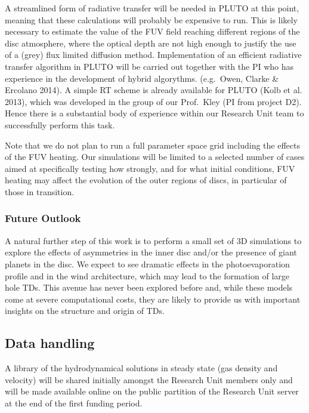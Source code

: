 \documentclass[10pt,fleqn,twoside]{article}
\begin{document}
A streamlined form of radiative transfer
will be needed in PLUTO at this point, meaning that these calculations will
probably be expensive to run.  This is likely necessary to estimate the value of the  FUV field
reaching different regions of the disc atmosphere, where the optical
depth are not high enough to justify the use of a  (grey) flux
limited diffusion method.  Implementation of an efficient
radiative transfer algorithm in PLUTO will be carried out together
with the PI who has experience in the development of hybrid
algorythms. (e.g.\ Owen, Clarke \& Ercolano 2014). A simple RT scheme is
already available for PLUTO (Kolb et al. 2013), which was developed in
the group of our Prof.\ Kley (PI from project D2). Hence there is
a substantial body of experience within our Research Unit team to
successfully perform this task.

Note that we do not plan to run a full
parameter space grid including the effects of the FUV heating. 
Our simulations will be limited to a selected number of cases
aimed at specifically testing how strongly, and for what initial
conditions, FUV heating may affect the evolution of the outer regions
of discs, in particular of those in transition.\\

\subsubsection{Future Outlook}

A natural further step of this work is to perform a small set of 3D
simulations to explore the effects of asymmetries in the inner
disc and/or the presence of giant planets in the disc. We expect to
see dramatic effects in the photoevaporation 
profile and in the wind architecture, which may lead to the formation
of large hole TDs. This avenue has never been explored before and,
while these models come at severe computational costs, they are likely to provide us
with important insights on the structure and origin of TDs. \\ 



\subsection{Data handling}

A library of the hydrodynamical solutions in steady state (gas density
and velocity)  will be shared initially amongst the Research Unit
members only and will be made available online on the public partition
of the Research Unit server at the end of the first funding period. 
\end{document}
